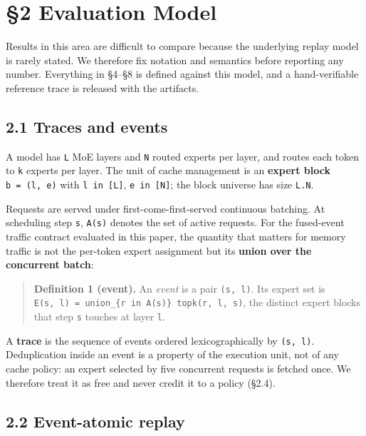 \documentclass[
  10pt,
  letterpaper,
  10pt]{article}
\begin{document}
\section{§2 Evaluation Model}\label{evaluation-model}

Results in this area are difficult to compare because the underlying
replay model is rarely stated. We therefore fix notation and semantics
before reporting any number. Everything in §4--§8 is defined against
this model, and a hand-verifiable reference trace is released with the
artifacts.

\subsection{2.1 Traces and events}\label{traces-and-events}

A model has \texttt{L} MoE layers and \texttt{N} routed experts per
layer, and routes each token to \texttt{k} experts per layer. The unit
of cache management is an \textbf{expert block} \texttt{b\ =\ (l,\ e)}
with \texttt{l\ in\ {[}L{]}}, \texttt{e\ in\ {[}N{]}}; the block
universe has size \texttt{L.N}.

Requests are served under first-come-first-served continuous batching.
At scheduling step \texttt{s}, \texttt{A(s)} denotes the set of active
requests. For the fused-event traffic contract evaluated in this paper,
the quantity that matters for memory traffic is not the per-token expert
assignment but its \textbf{union over the concurrent batch}:

\begin{quote}
\textbf{Definition 1 (event).} An \emph{event} is a pair
\texttt{(s,\ l)}. Its expert set is
\texttt{E(s,\ l)\ =\ union\_\{r\ in\ A(s)\}\ topk(r,\ l,\ s)}, the
distinct expert blocks that step \texttt{s} touches at layer \texttt{l}.
\end{quote}

A \textbf{trace} is the sequence of events ordered lexicographically by
\texttt{(s,\ l)}. Deduplication inside an event is a property of the
execution unit, not of any cache policy: an expert selected by five
concurrent requests is fetched once. We therefore treat it as free and
never credit it to a policy (§2.4).

\subsection{2.2 Event-atomic replay}\label{event-atomic-replay}
\end{document}
